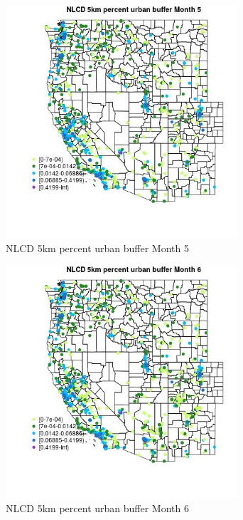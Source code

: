 \begin{figure} 
\centering  
\includegraphics[width=0.77\textwidth]{Code_Outputs/Report_ML_input_PM25_Step4_part_f_de_duplicated_aves_prioritize_24hr_obswNAs_MapObsMo5NLCD_5km_percent_urban_buffer.jpg} 
\caption{\label{fig:Report_ML_input_PM25_Step4_part_f_de_duplicated_aves_prioritize_24hr_obswNAsMapObsMo5NLCD_5km_percent_urban_buffer}NLCD 5km percent urban buffer Month 5} 
\end{figure} 
 

\begin{figure} 
\centering  
\includegraphics[width=0.77\textwidth]{Code_Outputs/Report_ML_input_PM25_Step4_part_f_de_duplicated_aves_prioritize_24hr_obswNAs_MapObsMo6NLCD_5km_percent_urban_buffer.jpg} 
\caption{\label{fig:Report_ML_input_PM25_Step4_part_f_de_duplicated_aves_prioritize_24hr_obswNAsMapObsMo6NLCD_5km_percent_urban_buffer}NLCD 5km percent urban buffer Month 6} 
\end{figure} 
 

